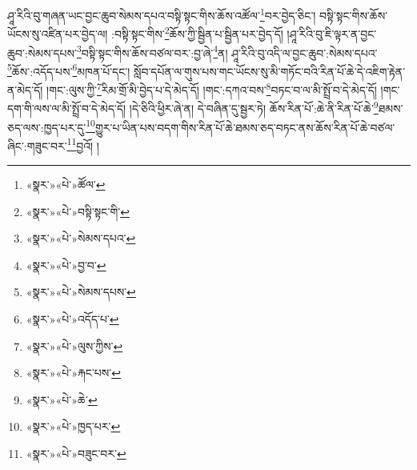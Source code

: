 ཤཱ་རིའི་བུ་གཞན་ཡང་བྱང་ཆུབ་སེམས་དཔའ་བསྟི་སྟང་གིས་ཆོས་འཚོལ་\footnote{«སྣར་»«པེ་»ཚོལ་}བར་བྱེད་ཅིང་། བསྟི་སྟང་གིས་ཆོས་ཡོངས་སུ་འཛིན་པར་བྱེད་ལ། :བསྟི་སྟང་གིས་\footnote{«སྣར་»«པེ་»བསྟི་སྟང་གི་}ཆོས་ཀྱི་སྦྱིན་པ་སྦྱིན་པར་བྱེད་དོ། །ཤཱ་རིའི་བུ་ཇི་ལྟར་ན་བྱང་ཆུབ་:སེམས་དཔས་\footnote{«སྣར་»«པེ་»སེམས་དཔའ་}བསྟི་སྟང་གིས་ཆོས་བཙལ་བར་:བྱ་ཞེ་\footnote{«སྣར་»«པེ་»བྱ་བ་}ན། ཤཱ་རིའི་བུ་འདི་ལ་བྱང་ཆུབ་:སེམས་དཔའ་\footnote{«སྣར་»«པེ་»སེམས་དཔས་}ཆོས་:འདོད་པས་\footnote{«སྣར་»«པེ་»འདོད་པ་}མཁན་པོ་དང་། སློབ་དཔོན་ལ་གུས་པས་གང་ཡོངས་སུ་མི་གཏོང་བའི་རིན་པོ་ཆེ་དེ་འཇིག་རྟེན་ན་མེད་དོ། །གང་:ལུས་ཀྱི་\footnote{«སྣར་»«པེ་»ལུས་ཀྱིས་}རིམ་གྲོ་མི་བྱེད་པ་དེ་མེད་དོ། །གང་:དཀའ་བས་\footnote{«སྣར་»«པེ་»རྐང་པས་}བཏང་བ་ལ་མི་སྤྲོ་བ་དེ་མེད་དོ། །གང་དག་གི་ལས་ལ་མི་སྤྲོ་བ་དེ་མེད་དོ། །དེ་ཅིའི་ཕྱིར་ཞེ་ན། དེ་བཞིན་དུ་སྦྱར་ཏེ། ཆོས་རིན་པོ་:ཆེ་ནི་རིན་པོ་ཆེ་\footnote{«སྣར་»«པེ་»ཆེ་}ཐམས་ཅད་ལས་:ཁྱད་པར་དུ་\footnote{«སྣར་»«པེ་»ཁྱད་པར་}གྱུར་པ་ཡིན་པས་བདག་གིས་རིན་པོ་ཆེ་ཐམས་ཅད་བཏང་ནས་ཆོས་རིན་པོ་ཆེ་བཙལ་ཞིང་:གཟུང་བར་\footnote{«སྣར་»«པེ་»བཟུང་བར་}བྱའོ། །
